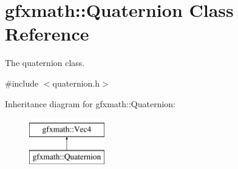 \hypertarget{classgfxmath_1_1_quaternion}{}\section{gfxmath\+:\+:Quaternion Class Reference}
\label{classgfxmath_1_1_quaternion}


The quaternion class.  




{\ttfamily \#include $<$quaternion.\+h$>$}

Inheritance diagram for gfxmath\+:\+:Quaternion\+:\begin{figure}[H]
\begin{center}
\leavevmode
\includegraphics[height=2.000000cm]{classgfxmath_1_1_quaternion}
\end{center}
\end{figure}

